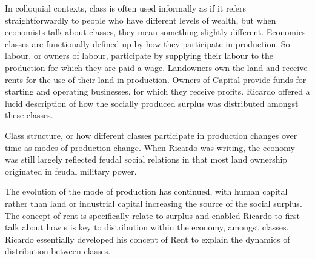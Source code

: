 In colloquial contexts, class is often used informally as if it refers straightforwardly to people who have different levels of wealth, but when economists talk about classes, they mean something slightly different. Economics classes are functionally defined up by how they participate in production. So labour, or owners of labour, participate by supplying their labour to the production for which they are paid a wage. Landowners own the land and receive rents for the use of their land in production. Owners of Capital provide funds for starting and operating businesses, for which they receive profits.  Ricardo offered a lucid description of  how the socially produced surplus was distributed amongst these classes. %

 Class structure, or how different classes participate in production changes over time as modes of production change. When Ricardo was writing, the economy was still largely reflected feudal social relations in that most land ownership originated in feudal military power. %
 
The evolution of the mode of production has continued, with human capital rather than land or industrial capital increasing the source of the social surplus. The concept of rent is specifically relate to surplus and enabled Ricardo to first talk about how s is key to distribution within the economy, amongst classes.  Ricardo essentially developed his concept of Rent to explain the dynamics of distribution between classes. 



